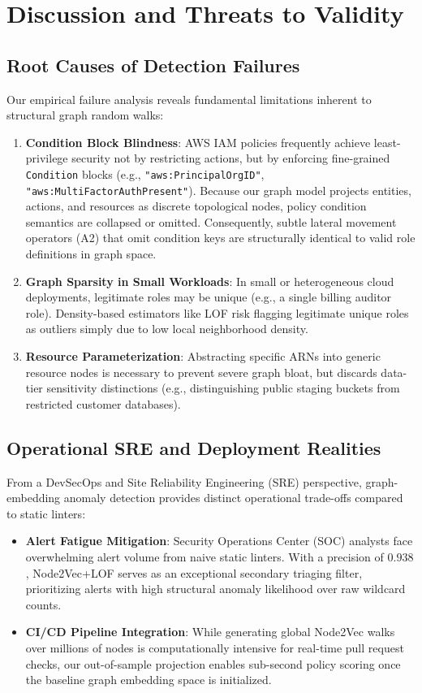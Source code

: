 \section{Discussion and Threats to Validity}
\label{sec:discussion}

\subsection{Root Causes of Detection Failures}
Our empirical failure analysis reveals fundamental limitations inherent to structural graph random walks:

\begin{enumerate}
    \item \textbf{Condition Block Blindness}: AWS IAM policies frequently achieve least-privilege security not by restricting actions, but by enforcing fine-grained \texttt{Condition} blocks (e.g., \texttt{"aws:PrincipalOrgID"}, \texttt{"aws:MultiFactorAuthPresent"}). Because our graph model projects entities, actions, and resources as discrete topological nodes, policy condition semantics are collapsed or omitted. Consequently, subtle lateral movement operators (A2) that omit condition keys are structurally identical to valid role definitions in graph space.
    \item \textbf{Graph Sparsity in Small Workloads}: In small or heterogeneous cloud deployments, legitimate roles may be unique (e.g., a single billing auditor role). Density-based estimators like LOF risk flagging legitimate unique roles as outliers simply due to low local neighborhood density.
    \item \textbf{Resource Parameterization}: Abstracting specific ARNs into generic resource nodes is necessary to prevent severe graph bloat, but discards data-tier sensitivity distinctions (e.g., distinguishing public staging buckets from restricted customer databases).
\end{enumerate}

\subsection{Operational SRE and Deployment Realities}
From a DevSecOps and Site Reliability Engineering (SRE) perspective, graph-embedding anomaly detection provides distinct operational trade-offs compared to static linters:
\begin{itemize}
    \item \textbf{Alert Fatigue Mitigation}: Security Operations Center (SOC) analysts face overwhelming alert volume from naive static linters. With a precision of $0.938$, Node2Vec+LOF serves as an exceptional secondary triaging filter, prioritizing alerts with high structural anomaly likelihood over raw wildcard counts.
    \item \textbf{CI/CD Pipeline Integration}: While generating global Node2Vec walks over millions of nodes is computationally intensive for real-time pull request checks, our out-of-sample projection enables sub-second policy scoring once the baseline graph embedding space is initialized.
\end{itemize}


